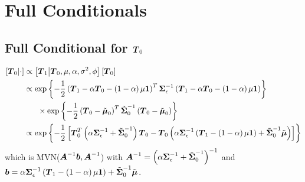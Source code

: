 \documentclass{article}\usepackage[]{graphicx}\usepackage[]{color}
\def\bm#1{\mbox{\boldmath $#1$}}
\begin{document}
\section{Full Conditionals}
%
%
\subsection{Full Conditional for $\bm{T}_0$}
%
\begin{align*}
%
\left[ \bm{T}_0 \middle| \cdot \right] & \propto \left[ \bm{T}_1 \middle| \bm{T}_0, \mu, \alpha, \sigma^2, \phi \right] \left[ \bm{T}_0 \right] \\
%
& \propto \exp{ \left\{ - \frac{1} {2} \left( \bm{T}_1 - \alpha \bm{T}_0 - \left( 1 - \alpha \right) \mu \bm{1} \right)^T \bm{\Sigma}_\epsilon^{ - 1} \left( \bm{T}_1 - \alpha \bm{T}_0 - \left( 1 - \alpha \right) \mu \bm{1} \right) \right\} }\\
& \hspace{6mm} \times \exp{ \left\{ - \frac{1} {2} \left( \bm{T}_0 - \tilde{\bm{\mu}}_0 \right)^T \tilde{\bm{\Sigma}}_0^{ - 1} \left( \bm{T}_0 - \tilde{\bm{\mu}}_0 \right) \right\} }\\
%
& \propto \exp{ \left\{ - \frac{1} {2} \left[ \bm{T}_0^T \left( \alpha \bm{\Sigma}_\epsilon^{ - 1} + \tilde{\bm{\Sigma}}_0^{ - 1} \right) \bm{T}_0 - \bm{T}_0 \left( \alpha \bm{\Sigma}_\epsilon^{ - 1} \left( \bm{T}_1 - \left( 1 - \alpha \right) \mu \bm{1} \right) + \tilde{\bm{\Sigma}}_0^{ - 1} \tilde{\bm{\mu}} \right) \right]\right\} }
%
\end{align*}
% 
which is MVN($\bm{A}^{ - 1}\bm{b}, \bm{A}^{ - 1}$) with $\bm{A}^{ - 1} = \left( \alpha \bm{\Sigma}_\epsilon^{ - 1} + \tilde{\bm{\Sigma}}_0^{ - 1} \right)^{ - 1}$ and $\bm{b} = \alpha \bm{\Sigma}_\epsilon^{ - 1} \left( \bm{T}_1 - \left( 1 - \alpha \right) \mu \bm{1} \right) + \tilde{\bm{\Sigma}}_0^{ - 1} \tilde{\bm{\mu}}$.
%
\end{document}
